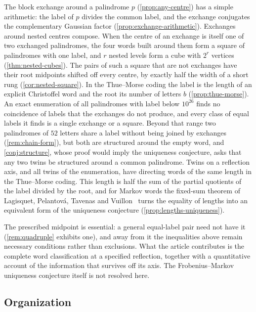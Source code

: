 The block exchange around a palindrome $p$ (\cref{prop:any-centre}) has a simple
arithmetic: the label of $p$ divides the common label, and the exchange conjugates
the complementary Gaussian factor (\cref{prop:exchange-arithmetic}). Exchanges
around nested centres compose. When the centre of an exchange is itself one of two
exchanged palindromes, the four words built around them form a square of palindromes
with one label, and $r$ nested levels form a cube with $2^r$ vertices
(\cref{thm:nested-cubes}). The pairs of such a square that are not exchanges have their
root midpoints shifted off every centre, by exactly half the width of a short rung
(\cref{cor:nested-square}). In the
Thue--Morse coding the label is the length of an explicit Christoffel word and the
root its number of letters $b$ (\cref{prop:thue-morse}). An exact enumeration of
all palindromes with label below $10^{26}$ finds no coincidence of labels that the
exchanges do not produce, and every class of equal labels it finds is a single exchange
or a square. Beyond that range two palindromes of $52$ letters share a label without being joined
by exchanges (\cref{rem:chain-form}), but both are structured around the empty word, and
\cref{conj:structure}, whose proof would imply the uniqueness conjecture, asks that any two twins
be structured around a common palindrome. Twins on a reflection axis, and all twins of the
enumeration, have directing words of the same length in the Thue--Morse coding. This
length is half the sum of the partial quotients of the label divided by the root, and for
Markov words the fixed-sum theorem of Lagisquet, Pelantov\'a, Tavenas and
Vuillon~\cite{LagisquetEtAl2021} turns the equality of lengths into an equivalent form of the
uniqueness conjecture (\cref{prop:lengths-uniqueness}).

The prescribed midpoint is essential: a general equal-label pair need not
have it (\cref{rem:quadruple} exhibits one), and away from it the inequalities
above remain necessary conditions rather than exclusions. What the article contributes is the
complete word classification at a specified reflection, together with a
quantitative account of the information that survives off its axis. The
Frobenius--Markov uniqueness conjecture itself is not resolved here.



\subsection{Organization}

